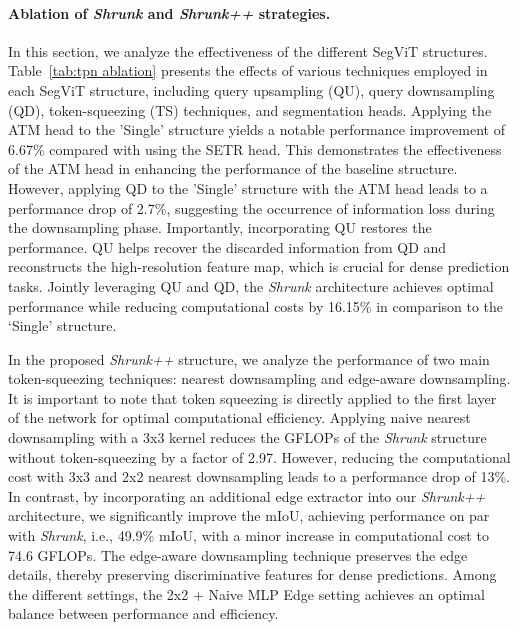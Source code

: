 \paragraph{Ablation of \emph{Shrunk} and \emph{Shrunk++} strategies.} In this section, we analyze the effectiveness of the different SegViT structures. Table~\ref{tab:tpn ablation} presents the effects of various techniques employed in each SegViT structure, including query upsampling (QU), query downsampling (QD), token-squeezing (TS) techniques, and segmentation heads.
Applying the ATM head to the 'Single' structure yields a notable performance improvement of 6.67\% compared with using the SETR head.  This demonstrates the effectiveness of the ATM head in enhancing the performance of the baseline structure.
However, applying QD to the 'Single' structure with the ATM head leads to a performance drop of 2.7\%, suggesting the occurrence of information loss during the downsampling phase.
Importantly, incorporating QU restores the performance. QU helps recover the discarded information from QD and reconstructs the high-resolution feature map, which is crucial for dense prediction tasks.
Jointly leveraging QU and QD, the \emph{Shrunk} architecture achieves optimal performance while reducing computational costs by 16.15\% in comparison to the `Single' structure.

In the proposed \emph{Shrunk++} structure, we analyze the performance of two main token-squeezing techniques: nearest downsampling and edge-aware downsampling. It is important to note that token squeezing is directly applied to the first layer of the network for optimal computational efficiency.
Applying naive nearest downsampling with a 3x3 kernel reduces the GFLOPs of the \emph{Shrunk} structure without token-squeezing by a factor of 2.97. However, reducing the computational cost with 3x3 and 2x2 nearest downsampling leads to a performance drop of 13\%.
In contrast, by incorporating an additional edge extractor into our \emph{Shrunk++} architecture, we significantly improve the mIoU, achieving performance on par with \emph{Shrunk}, i.e., 49.9\% mIoU, with a minor increase in computational cost to 74.6 GFLOPs. The edge-aware downsampling technique preserves the edge details, thereby preserving discriminative features for dense predictions.
Among the different settings, the 2x2 + Naive MLP Edge setting achieves an optimal balance between performance and efficiency.

